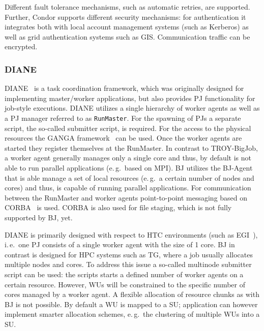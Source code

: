 \documentclass{sig-alternate}
\begin{document}
Different fault tolerance mechanisms, such as automatic retries, are
supported.  Further, Condor supports different security mechanisms:
for authentication it integrates both with local account management
systems (such as Kerberos) as well as grid authentication systems such
as GIS. Communication traffic can be encrypted.


\subsubsection{DIANE}
DIANE~\cite{Moscicki:908910} is a task coordination framework, which
was originally designed for implementing master/worker applications,
but also provides PJ functionality for job-style executions. DIANE
utilizes a single hierarchy of worker agents as well as a PJ manager
referred to as \texttt{RunMaster}.
For the spawning of PJs a separate script, the so-called submitter script, is
required. For the access to the physical resources the GANGA
framework~\cite{Moscicki20092303} can be used.
Once the worker agents are started they register themselves at the RunMaster.
In contrast to TROY-BigJob, a worker agent generally manages only a single
core and thus, by default is not able to run parallel applications (e.\,g.\
based on MPI). BJ utilizes the BJ-Agent that is able manage a set of local
resources (e.\,g.\ a certain number of nodes and cores) and thus, is capable
of running parallel applications. For communication between the RunMaster and
worker agents point-to-point messaging based on CORBA~\cite{OMG-CORBA303:2004}
is used. CORBA is also used for file staging, which is not fully supported by
BJ, yet.

DIANE is primarily designed with respect to HTC environments (such as
EGI~\cite{egi}), i.\,e.\ one PJ consists of a single worker agent with the
size of 1 core. BJ in contrast is designed for HPC systems such as TG,
where a job usually allocates multiple nodes and cores. To address this issue
a so-called multinode submitter script can be used: the scripts starts a
defined number of worker agents on a certain resource. However, WUs will be
constrained to the specific number of cores managed by a worker agent. A
flexible allocation of resource chunks as with BJ is not possible. By
default a WU is mapped to a SU; application can however implement smarter
allocation schemes, e.\,g.\ the clustering of multiple WUs into a SU.
\end{document}
